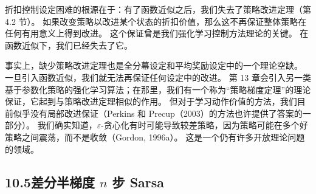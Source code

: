 \documentclass[UTF8,12pt,a4paper,fontset=fandol]{ctexart}
\begin{document}
\begin{center}
\end{center}

折扣控制设定困难的根源在于：有了函数近似之后，我们失去了策略改进定理（第 4.2 节）。
如果改变策略以改进某个状态的折扣价值，那么这不再保证整体策略在任何有用意义上得到改进。
这个保证曾是我们强化学习控制方法理论的关键。
在函数近似下，我们已经失去了它。

事实上，缺少策略改进定理也是全分幕设定和平均奖励设定中的一个理论空缺。
一旦引入函数近似，我们就无法再保证任何设定中的改进。
第 13 章会引入另一类基于参数化策略的强化学习算法；在那里，我们有一个称为“策略梯度定理”的理论保证，它起到与策略改进定理相似的作用。
但对于学习动作价值的方法，我们目前似乎没有局部改进保证（Perkins 和 Precup（2003）的方法也许提供了答案的一部分）。
我们确实知道，$\varepsilon$-贪心化有时可能导致较差策略，因为策略可能在多个好策略之间震荡，而不是收敛（Gordon, 1996a）。
这是一个仍有许多开放理论问题的领域。

\subsection*{10.5\quad 差分半梯度 $n$ 步 Sarsa}
\end{document}
